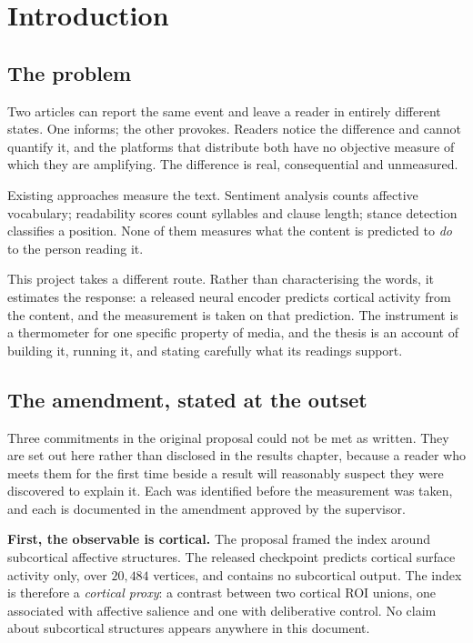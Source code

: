 \chapter{Introduction}
\label{ch:intro}

\section{The problem}

Two articles can report the same event and leave a reader in entirely different states. One
informs; the other provokes. Readers notice the difference and cannot quantify it, and the
platforms that distribute both have no objective measure of which they are amplifying. The
difference is real, consequential and unmeasured.

Existing approaches measure the text. Sentiment analysis counts affective vocabulary;
readability scores count syllables and clause length; stance detection classifies a position.
None of them measures what the content is predicted to \emph{do} to the person reading it.

This project takes a different route. Rather than characterising the words, it estimates the
response: a released neural encoder predicts cortical activity from the content, and the
measurement is taken on that prediction. The instrument is a thermometer for one specific
property of media, and the thesis is an account of building it, running it, and stating
carefully what its readings support.

\section{The amendment, stated at the outset}
\label{sec:amendment}

Three commitments in the original proposal could not be met as written. They are set out here
rather than disclosed in the results chapter, because a reader who meets them for the first
time beside a result will reasonably suspect they were discovered to explain it. Each was
identified before the measurement was taken, and each is documented in the amendment approved
by the supervisor.

\textbf{First, the observable is cortical.} The proposal framed the index around subcortical
affective structures. The released checkpoint predicts cortical surface activity only, over
$20{,}484$ vertices, and contains no subcortical output. The index is therefore a
\emph{cortical proxy}: a contrast between two cortical ROI unions, one associated with
affective salience and one with deliberative control. No claim about subcortical structures
appears anywhere in this document.

